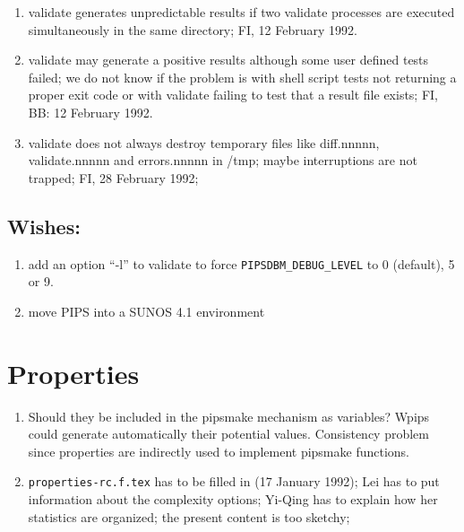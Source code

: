 \begin{enumerate}
  \item validate generates unpredictable results if two validate
	processes are executed simultaneously in the same directory;
	FI, 12 February 1992.

  \item validate may generate a positive results although some user
	defined tests failed; we do not know if the problem is with
	shell script tests not returning a proper exit code or
	with validate failing to test that a result file exists;
	FI, BB: 12 February 1992.

  \item validate does not always destroy temporary files like diff.nnnnn,
	validate.nnnnn
	and errors.nnnnn in /tmp; maybe interruptions are not trapped;
	FI, 28 February 1992;

\end{enumerate}

\subsection{Wishes:}

\begin{enumerate}

  \item add an option ``-l'' to validate to force \verb+PIPSDBM_DEBUG_LEVEL+ to
	0 (default), 5 or 9.

  \item move PIPS into a SUNOS 4.1 environment

\end{enumerate}

\section{Properties}

\begin{enumerate}

  \item Should they be included in the pipsmake mechanism as variables?
	Wpips could generate automatically their potential values.
	Consistency problem since properties are indirectly used to implement
	pipsmake functions.

  \item \verb+properties-rc.f.tex+ has to be filled in (17 January 1992);
	Lei has to put information about the complexity options; Yi-Qing
	has to explain how her statistics are organized; the present
	content is too sketchy;

\end{enumerate}

